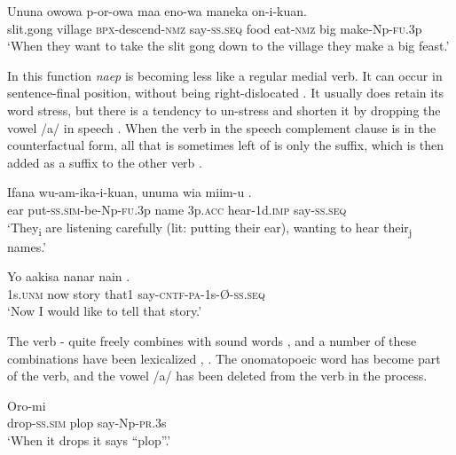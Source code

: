 \ea%
\label{ex:3:x1608}
\gll {\ob}Ununa owowa p-or-owa{\cb}  maa eno-wa maneka on-i-kuan.\\
slit.gong village \textsc{bpx}-descend-\textsc{nmz} say-\textsc{ss}.\textsc{seq} food eat-\textsc{nmz} big make-Np-\textsc{fu}.3p\\
\glt`When they want to take the slit gong down to the village they make a big feast.'
\z

In this function \textit{naep} is becoming less like a regular medial verb. It can occur in sentence-final position, without being right-dislocated . It usually does retain its word stress, but there is a tendency to un-stress and shorten it by dropping the vowel /a/ in speech . When the verb in the speech complement clause is in the counterfactual form, all that is sometimes left of  is only the suffix, which is then added as a suffix to the other verb .

\ea%
\label{ex:3:x1830}
\gll Ifana wu-am-ika-i-kuan, {\ob}unuma wia miim-u{\cb} \textstyleEmphasizedVernacularWords{-}.\\
ear put-\textsc{ss}.\textsc{sim}-be-Np-\textsc{fu}.3p name 3p.\textsc{acc} hear-1d.\textsc{imp} say-\textsc{ss}.\textsc{seq}\\
\glt`They\textsubscript{i} are listening carefully (lit: putting their ear), wanting to hear their\textsubscript{j} names.'
\z

\ea%
\label{ex:3:x1609}
\gll Yo aakisa nanar nain . \\
1s.\textsc{unm} now story that1 say-\textsc{cntf}-\textsc{pa}-1s-{\O}-\textsc{ss}.\textsc{seq}\\
\glt`Now I would like to tell that story.'
\z

The verb - quite freely combines with sound words , and a number of these combinations have been lexicalized , . The onomatopoeic word has become part of the verb, and the vowel /a/ has been deleted from the verb in the process.

\ea%
\label{ex:3:x330}
\gll Oro-mi   \\
drop-\textsc{ss}.\textsc{sim} plop say-Np-\textsc{pr}.3s \\
\glt`When it drops it says ``plop''.'
\z

